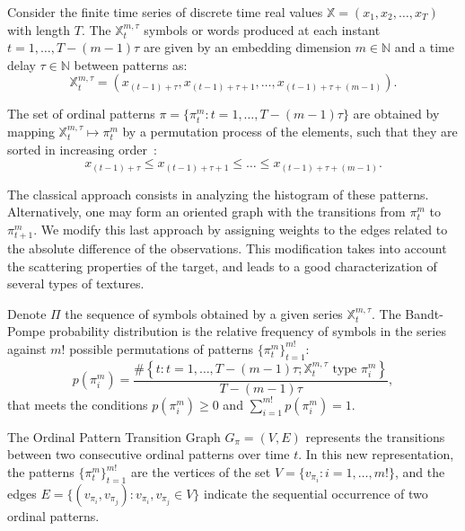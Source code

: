 \documentclass{isprs}
\begin{document}
	Consider the finite time series of discrete time real values $\mathbb{X} = (x_1, x_2, \dots, x_T)$ with length $T$.
	The $\mathbb{X}_t^{m, \tau} $ symbols or words produced at each instant $t = 1, \dots, T- (m-1) \tau$ are given by an embedding dimension $m \in \mathbb{N}$ and a time delay $\tau \in \mathbb{N}$ between patterns as:
	\begin{equation}
	\mathbb{X}_t^{m,\tau} = (x_{(t-1)+\tau}, x_{(t-1)+\tau+1},\ldots, x_{(t-1)+\tau+(m-1)}).
	\end{equation}
	
	The set of ordinal patterns $\pi = \{\pi_t^m: t = 1, \dots, T- (m-1) \tau \}$ are obtained by mapping $\mathbb{X}^{m, \tau}_t \mapsto \pi^m_t$ by a permutation process of the elements, such that they are sorted in increasing order~\cite{Ravetti2014noise}:
	$$
	x_{(t-1) + \tau} \leq x_{(t-1) + \tau + 1} \leq \dots \leq x_{(t-1) + \tau + (m-1)}.
	$$
	
	The classical approach consists in analyzing the histogram of these patterns.
	Alternatively, one may form an oriented graph with the transitions from $\pi_t^m$ to $\pi_{t+1}^m$.
	We modify this last approach by assigning weights to the edges related to the absolute difference of the observations.
	This modification takes into account the scattering properties of the target, and leads to a good characterization of several types of textures.
	
	Denote $\Pi$ the sequence of symbols obtained by a given series $\mathbb{X}_t^{m,\tau}$.
	The Bandt-Pompe probability distribution is the relative frequency of symbols in the series against $m!$ possible permutations of patterns $\{\pi_t^m \}_{t = 1}^{m!}$:
	\begin{equation}
	p(\pi_i^m) = \frac{\#\left \{t : t = 1, \dots, T-(m-1)\tau; \mathbb{X}_t^{m,\tau} \text{ type } \pi_i^m\right \}}{T- (m-1)\tau},  
	\end{equation}
	that meets the conditions $p(\pi_i^m) \ge 0$ and  $\sum_{i=1}^{m!} p(\pi_i^m) = 1$.
	
	The Ordinal Pattern Transition Graph ${G}_{\pi} = ({V}, {E})$ represents the transitions between two consecutive ordinal patterns over time $t$.
	In this new representation, the patterns $\{\pi_t^m \}_{t = 1}^{m!}$ are the vertices of the set $V = \{v_{\pi_i}: i = 1, \dots, m! \}$, and the edges $E = \{(v_{\pi_i}, v_{\pi_j}): v_{\pi_i}, v_{\pi_j} \in V \}$ indicate the sequential occurrence of two ordinal patterns.
	
\end{document}
